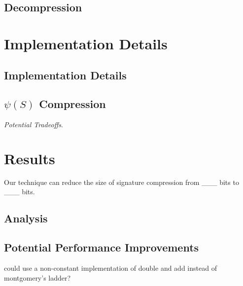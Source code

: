 \subsection{Decompression}

\section{Implementation Details}
\label{sec:compimplementation}

\subsection{Implementation Details}

\subsection{$\psi(S)$ Compression}

\noindent
\textit{Potential Tradeoffs}.

\section{Results}

Our technique can reduce the size of \sidh signature compression from \_\_\_ bits to \_\_\_ bits.

\subsection{Analysis}

\subsection{Potential Performance Improvements}

could use a non-constant implementation of double and add instead of montgomery's ladder? 

